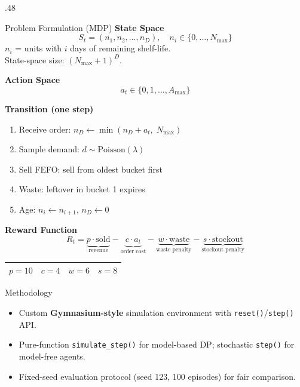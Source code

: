 \documentclass[final]{beamer}
\begin{document}
\begin{frame}[t]{}
\begin{columns}[T]
\begin{column}{.48\textwidth}
\begin{alertblock}{Problem Formulation (MDP)}
\textbf{State Space}
\[
  S_t = (n_1, n_2, \ldots, n_D), \quad n_i \in \{0, \ldots, N_{\max}\}
\]
$n_i$ = units with $i$ days of remaining shelf-life.\\
State-space size: $(N_{\max}+1)^{D}$.

\medskip
\textbf{Action Space}
\[
  a_t \in \{0, 1, \ldots, A_{\max}\}
\]

\textbf{Transition (one step)}
\begin{enumerate}
  \item Receive order: $n_D \leftarrow \min(n_D + a_t,\; N_{\max})$
  \item Sample demand: $d \sim \text{Poisson}(\lambda)$
  \item Sell FEFO: sell from oldest bucket first
  \item Waste: leftover in bucket 1 expires
  \item Age: $n_i \leftarrow n_{i+1}$, \; $n_D \leftarrow 0$
\end{enumerate}

\medskip
\textbf{Reward Function}
\[
  R_t = \underbrace{p \cdot \text{sold}}_{\text{revenue}}
      - \underbrace{c \cdot a_t}_{\text{order cost}}
      - \underbrace{w \cdot \text{waste}}_{\text{waste penalty}}
      - \underbrace{s \cdot \text{stockout}}_{\text{stockout penalty}}
\]

\begin{center}
\begin{tabular}{cccc}
\toprule
$p=10$ & $c=4$ & $w=6$ & $s=8$ \\
\bottomrule
\end{tabular}
\end{center}

\end{alertblock}

\begin{block}{Methodology}
\begin{itemize}
  \item Custom \textbf{Gymnasium-style} simulation environment with \texttt{reset()}/\texttt{step()} API.
  \item Pure-function \texttt{simulate\_step()} for model-based DP; stochastic \texttt{step()} for model-free agents.
  \item Fixed-seed evaluation protocol (seed 123, 100 episodes) for fair comparison.
\end{itemize}
\end{block}


\end{column}
\end{columns}
\end{frame}
\end{document}
